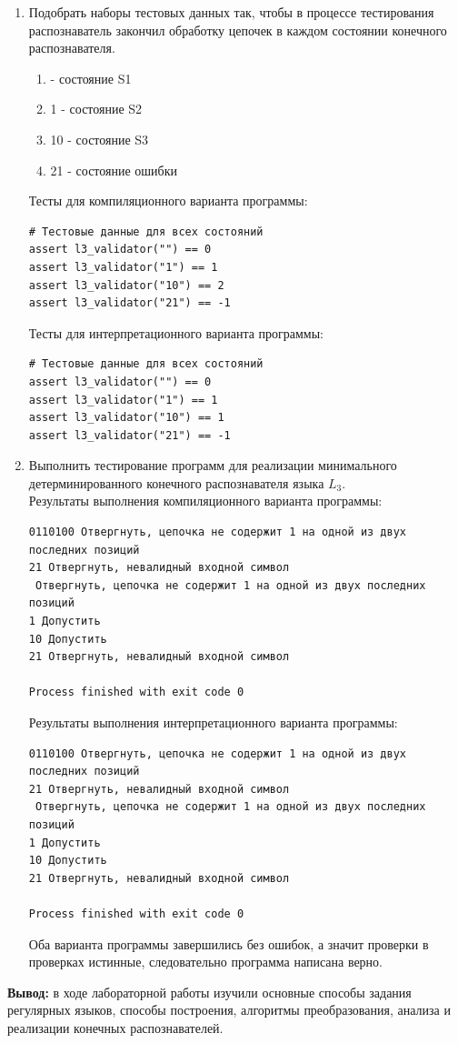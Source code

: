 \documentclass[a4paper,14pt]{extarticle}
\begin{document}
\begin{enumerate}[1.]
\item Подобрать наборы тестовых данных так, чтобы в процессе тестирования
распознаватель закончил обработку цепочек в каждом состоянии конечного
распознавателя.

\begin{enumerate}
    \item <пустая строка> - состояние S1
    \item 1 - состояние S2
    \item 10 - состояние S3
    \item 21 - состояние ошибки
\end{enumerate}

Тесты для компиляционного варианта программы:\\
\begin{verbatim}
# Тестовые данные для всех состояний
assert l3_validator("") == 0
assert l3_validator("1") == 1
assert l3_validator("10") == 2
assert l3_validator("21") == -1
\end{verbatim}

Тесты для интерпретационного варианта программы:\\
\begin{verbatim}
# Тестовые данные для всех состояний
assert l3_validator("") == 0
assert l3_validator("1") == 1
assert l3_validator("10") == 1
assert l3_validator("21") == -1
\end{verbatim}

\item Выполнить тестирование программ для реализации минимального
детерминированного конечного распознавателя языка $L_3$.\\

Результаты выполнения компиляционного варианта программы:\\
\begin{verbatim}
0110100 Отвергнуть, цепочка не содержит 1 на одной из двух последних позиций
21 Отвергнуть, невалидный входной символ
 Отвергнуть, цепочка не содержит 1 на одной из двух последних позиций
1 Допустить
10 Допустить
21 Отвергнуть, невалидный входной символ

Process finished with exit code 0
\end{verbatim}

Результаты выполнения интерпретационного варианта программы:\\
\begin{verbatim}
0110100 Отвергнуть, цепочка не содержит 1 на одной из двух последних позиций
21 Отвергнуть, невалидный входной символ
 Отвергнуть, цепочка не содержит 1 на одной из двух последних позиций
1 Допустить
10 Допустить
21 Отвергнуть, невалидный входной символ

Process finished with exit code 0
\end{verbatim}

Оба варианта программы завершились без ошибок, а значит проверки 
в проверках истинные, следовательно программа написана верно.

\end{enumerate}

\textbf{Вывод: } в ходе лабораторной работы изучили основные способы задания регулярных языков, 
способы построения, алгоритмы преобразования, анализа и реализации конечных 
распознавателей.
\end{document}
